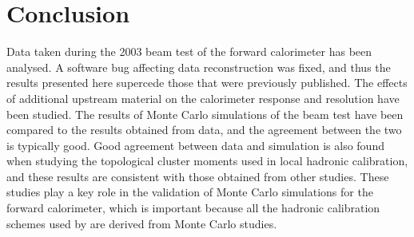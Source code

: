 \chapter{Conclusion}

%
%
%
%
%

Data taken during the 2003 beam test of the \atlas forward calorimeter has been analysed. A software bug affecting data reconstruction was fixed, and thus the results presented here supercede those that were previously published. The effects of additional upstream material on the calorimeter response and resolution have been studied. The results of Monte Carlo simulations of the beam test have been compared to the results obtained from data, and the agreement between the two is typically good. Good agreement between data and simulation is also found when studying the topological cluster moments used in local hadronic calibration, and these results are consistent with those obtained from other studies. These studies play a key role in the validation of Monte Carlo simulations for the \atlas forward calorimeter, which is important because all the hadronic calibration schemes used by \atlas are derived from Monte Carlo studies.


